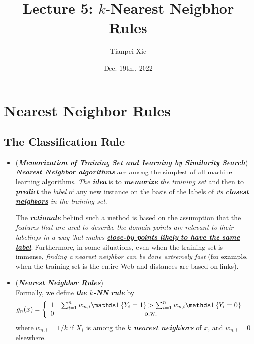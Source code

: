 \documentclass[11pt]{article}
\begin{document}
\title{Lecture 5: $k$-Nearest Neigbhor Rules}
\author{ Tianpei Xie}
\date{ Dec. 19th., 2022 }
\maketitle
\tableofcontents
\newpage
\section{Nearest Neighbor Rules}
\subsection{The Classification Rule}
\begin{itemize}
\item \begin{remark} (\emph{\textbf{Memorization of Training Set and Learning by Similarity Search}})\\
\emph{\textbf{Nearest Neighbor algorithms}} are among the simplest of all machine learning algorithms.  \emph{The \textbf{idea}} is to \underline{\emph{\textbf{memorize} the training set}} and then to \emph{\textbf{predict}} the \emph{label} of any new instance on the basis of the labels of \emph{its \underline{\textbf{closest neighbors}} in the training set}. 

The \emph{\textbf{rationale}} behind such a method is based on the assumption that the \emph{features that are used to describe the domain points are relevant to their labelings in a way that makes \textbf{\underline{close-by points likely to have the same label}}}. Furthermore, in some situations, even when the training set is immense, \emph{finding a nearest neighbor can be done extremely fast} (for example, when the training set is the entire Web and distances are based on links).
\end{remark}


\item \begin{definition} (\emph{\textbf{Nearest Neighbor Rules}})\\
Formally, we define \underline{\emph{\textbf{the $k$-NN rule}}} by
\begin{align*}
g_n(x) &= \left\{\begin{array}{cc}
1 & \sum_{i=1}^{n}w_{n,i}\ind{Y_i = 1} > \sum_{i=1}^{n}w_{n,i}\ind{Y_i = 0}\\
0 & \text{o.w.}
\end{array}
\right.
\end{align*} where $w_{n,i} = 1/ k$ if $X_i$ is among the \emph{\textbf{$k$ nearest neighbors}} of $x$, and $w_{n,i} = 0$ elsewhere. 


\end{definition}
\end{itemize}
\end{document}
